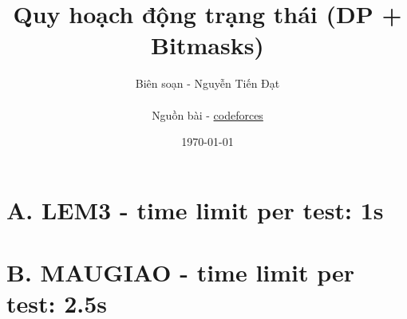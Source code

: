 \documentclass[a4paper,17pt]{article}
\title{Quy hoạch động trạng thái (DP + Bitmasks)}
\author{
    Biên soạn - Nguyễn Tiến Đạt \\ \\
    Nguồn bài - \href{https://codeforces.com/}{codeforces}
}
\date{\today}
\begin{document}
    \maketitle
    \newpage
    \tableofcontents
    \newpage
    \section{\textbf{A. LEM3 - time limit per test: 1s}}
        
    \section{\textbf{B. MAUGIAO - time limit per test: 2.5s}}
        
\end{document}
